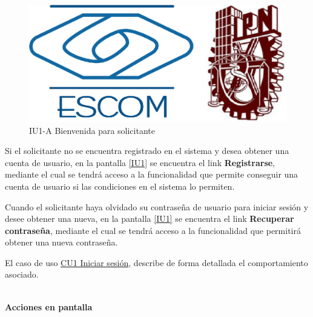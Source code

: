 		\begin{figure}[h]

			\begin{center}
			
				\includegraphics[scale=0.35]{./imagenes/IUs/RegistroSolicitantes/iu1-IniciarSesion/IU1-A-BienvenidaSolicitante.jpg}
				\caption{IU1-A Bienvenida para solicitante}
				\label{IU1-A}

			\end{center} 				

		\end{figure}

		\pagebreak
		Si el solicitante no se encuentra registrado en el sistema y desea obtener una cuenta de usuario, en la pantalla \ref{IU1} se encuentra el link \textbf{Registrarse}, mediante el cual se tendrá acceso a la funcionalidad que permite conseguir una cuenta de usuario si las condiciones en el sistema lo permiten.

		Cuando el solicitante haya olvidado su contraseña de usuario para iniciar sesión y desee obtener una nueva, en la pantalla \ref{IU1} se encuentra el link \textbf{Recuperar contraseña}, mediante el cual se tendrá acceso a la funcionalidad que permitirá obtener una nueva contraseña.

		El caso de uso \hyperlink{CU1}{CU1 Iniciar sesión}, describe de forma detallada el comportamiento asociado.

	\noindent \textbf{\\Acciones en pantalla}

